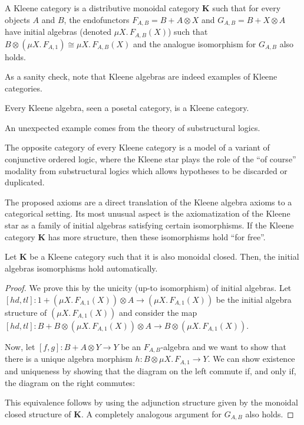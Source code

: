 \documentclass[sigconf,anonymous,review,screen]{acmart}
\newcommand{\cat}[1]{\mathbf{#1}}
\newif\ifdraft
\newcommand{\steven}[1]{\ifdraft{\color{orange}[{\bf Steven}: #1]}\fi}
\begin{document}
\begin{definition}
  A Kleene category is a distributive monoidal category $\cat{K}$
  such that for every objects $A$ and $B$, the endofunctors $F_{A, B}
  = B + A \otimes X$ and $G_{A, B} = B + X \otimes A$ have initial
  algebras (denoted $\mu X.\, F_{A, B}(X)$) such that $B \otimes (\mu
  X.\, F_{A, 1}) \cong \mu X.\, F_{A, B}(X)$ and the analogue isomorphism
  for $G_{A,B}$ also holds.
\end{definition}

As a sanity check, note that Kleene algebras are indeed examples of
Kleene categories.

\begin{example}
  Every Kleene algebra, seen a posetal category, is a Kleene category.
\end{example}

An unexpected example comes from the theory of substructural logics.

\begin{example}
  The opposite category of every Kleene category is a model of a variant of
  conjunctive ordered logic, where the Kleene star plays the role of the ``of
  course'' modality from substructural logics which allows hypotheses to
  be discarded or duplicated.
\end{example}

\steven{What is the ``of course'' modality? Is this ``$!$'' in linear logic?}

The proposed axioms are a direct translation of the Kleene algebra
axioms to a categorical setting. Its most unusual aspect is the
axiomatization of the Kleene star as a family of initial algebras
satisfying certain isomorphisms. If the Kleene category $\cat{K}$ has
more structure, then these isomorphisms hold ``for free''.

\begin{theorem}
  \label{th:kleeneclosed}
  Let $\cat{K}$ be a Kleene category such that it is also monoidal
  closed.  Then, the initial algebras isomorphisms hold automatically.
\end{theorem}
\begin{proof}
  We prove this by the unicity (up-to isomorphism) of initial
  algebras. Let $[hd, tl]: 1 + (\mu X.\, F_{A, 1}(X)) \otimes A \to
  (\mu X.\, F_{A, 1}(X))$ be the initial algebra structure of $(\mu
  X.\, F_{A, 1}(X))$ and consider the map $[hd, tl] : B + B \otimes
  (\mu X.\, F_{A, 1}(X)) \otimes A \to B\otimes (\mu X.\, F_{A,
    1}(X))$.

  Now, let $[f,g] : B + A \otimes Y \to Y$ be an $F_{A,B}$-algebra and
  we want to show that there is a unique algebra morphism $h : B
  \otimes \mu X.\, F_{A,1} \to Y$. We can show existence and uniqueness
  by showing that the diagram on the left commute if, and only if,
  the diagram on the right commutes:

  This equivalence follows by using the adjunction structure given
  by the monoidal closed structure of $\cat{K}$. A completely analogous
  argument for $G_{A,B}$ also holds.
\end{proof}
\end{document}
